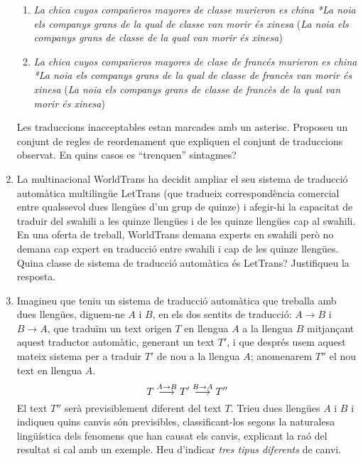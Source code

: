 \begin{enumerate}
\begin{enumerate}
\item \emph{La chica cuyos compañeros mayores de classe murieron es
    china} \newline \emph{*La noia els companys grans de la qual de
    classe van morir és xinesa} \newline (\emph{La noia els companys grans de
    classe de la qual van morir és xinesa})

\item \emph{La chica cuyos compañeros mayores de clase de francés murieron es
    china} \newline \emph{*La noia els companys grans de la qual de
    classe de
    francès van morir és xinesa} \newline (\emph{La noia els companys grans
    de classe de francès de la qual van morir és xinesa})

\end{enumerate}
Les traduccions inacceptables estan marcades amb un asterisc.
Proposeu un conjunt de regles de reordenament que expliquen el conjunt de
traduccions observat. En quins casos es ``trenquen'' sintagmes?

\item La multinacional WorldTrans ha decidit ampliar el seu sistema de
  traducció automàtica multilingüe LetTrans (que tradueix
  correspondència comercial entre qualssevol dues llengües d'un grup
  de quinze) i afegir-hi la capacitat de traduir del swahili a les
  quinze llengües i de les quinze llengües cap al swahili. En una
  oferta de treball, WorldTrans demana experts en swahili però no
  demana cap expert en traducció entre swahili i cap de les quinze
  llengües. Quina classe de sistema de traducció automàtica és
  LetTrans?  Justifiqueu la resposta.

  \item Imagineu que teniu un sistema de traducció automàtica que
    treballa amb dues llengües, diguem-ne $A$ i $B$, en els dos
    sentits de traducció: $A{\rightarrow}B$ i $B{\rightarrow}A$, que
    traduïm un text origen $T$ en llengua $A$ a la llengua $B$
    mitjançant aquest traductor automàtic, generant un text $T'$, i
    que després usem aquest mateix sistema per a traduir $T'$ de nou a
    la llengua $A$; anomenarem $T''$ el nou text en llengua $A$.
      \begin{equation}
        T \stackrel{\scriptsize A\rightarrow
        B}{\longrightarrow}T'\stackrel{\scriptsize B\rightarrow
        A}{\longrightarrow} T''
      \end{equation}
      El text $T''$ serà previsiblement diferent del text $T$.  Trieu
      dues llengües $A$ i $B$ i indiqueu quins canvis són previsibles,
      classificant-los segons la naturalesa lingüística dels fenomens
      que han causat els canvis, explicant la raó del resultat si cal
      amb un exemple. Heu d'indicar \emph{tres tipus diferents} de
      canvi.


\end{enumerate}
